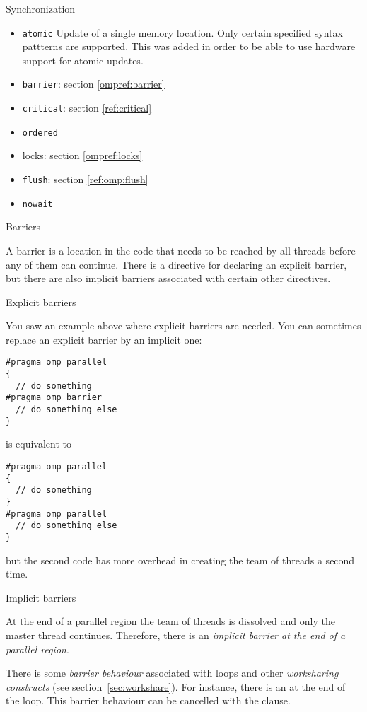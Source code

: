  {Synchronization}

\begin{itemize}
\item \texttt{atomic} Update of a single memory location. Only certain
  specified syntax pattterns are supported. This was added in order to
  be able to use hardware support for atomic updates.
\item \texttt{barrier}: section \ref{ompref:barrier}
\item \texttt{critical}: section \ref{ref:critical}
\item \texttt{ordered}
\item locks: section \ref{ompref:locks}
\item \texttt{flush}: section \ref{ref:omp:flush}
\item \texttt{nowait}
\end{itemize}

 {Barriers}
\label{ompref:barrier}

A barrier is a location in the code that needs to be reached
by all threads before any of them can continue. There is 
a directive for declaring an explicit barrier, but 
there are also implicit barriers associated with certain other 
directives.

 {Explicit barriers}

You saw an example above where explicit barriers are needed.
You can sometimes replace an explicit barrier by an implicit one:
\begin{verbatim}
#pragma omp parallel
{
  // do something
#pragma omp barrier
  // do something else
}
\end{verbatim}
is equivalent to
\begin{verbatim}
#pragma omp parallel
{
  // do something
}
#pragma omp parallel
  // do something else
}
\end{verbatim}
but the second code has more overhead in creating the team of threads a second time.

 {Implicit barriers}

At the end of a parallel region the team of threads is dissolved and
only the master thread continues. Therefore, there is an
\emph{implicit barrier at the end of a parallel region}.

There is some \emph{barrier behaviour} associated with  loops and other
\emph{worksharing constructs} (see section~\ref{sec:workshare}).  For instance, there
is an  at the end of the loop. This
barrier behaviour can be cancelled with the 
clause.

